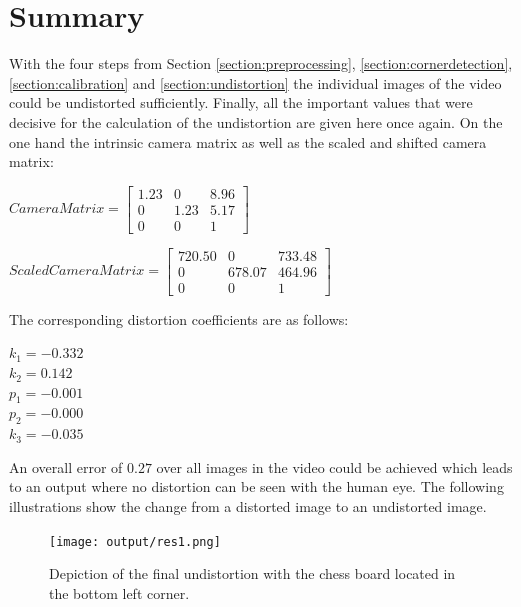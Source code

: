 \documentclass[twocolumn,10pt]{asme2ej}
\begin{document}
\section{Summary}
\label{section:summary}
\noindent
With the four steps from Section \ref{section:preprocessing},
\ref{section:cornerdetection},\ref{section:calibration} and 
\ref{section:undistortion} the individual images of the video could 
be undistorted sufficiently.
\noindent
Finally, all the important values that were decisive for the calculation of the undistortion are given here once again.
On the one hand the intrinsic camera matrix as well as the scaled and shifted camera matrix: 

\begin{center}
    $Camera Matrix = \begin{bmatrix}
    1.23 & 0 & 8.96 \\
   0 & 1.23& 5.17 \\
   0 & 0 & 1
   \end{bmatrix}
   $
    \label{eq_intrinsicmatrix}
\end{center}

\begin{center}
    $Scaled Camera Matrix = \begin{bmatrix}
        720.50 & 0 & 733.48 \\
   0 & 678.07 & 464.96 \\
   0 & 0 & 1
   \end{bmatrix}
   $
    \label{final_intrinsic}
\end{center}
The corresponding distortion coefficients are as follows:
\begin{center}
    $k_1 = -0.332$\\
    $k_2 =  0.142$\\
    $p_1 = -0.001$\\
    $p_2 = -0.000$\\
    $k_3 = -0.035$\\
    \label{eq_distcoeff}
\end{center}
\noindent
An overall error of $0.27$ over all images in the video could be 
achieved which leads to an output where no distortion can be seen with the human eye.
The following illustrations show the change from a distorted image to an undistorted image.

\begin{figure}[H]
    \onecolumn\centerline{\texttt{[image: output/res1.png]}}
\caption{Depiction of the final undistortion with the chess board located in the bottom left corner.}
\label{fig:res1}
\end{figure}
\end{document}
